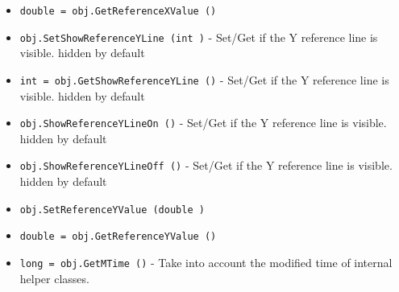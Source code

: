 \begin{itemize}
\item  \verb|double = obj.GetReferenceXValue ()|

\item  \verb|obj.SetShowReferenceYLine (int )| -  Set/Get if the Y reference line is visible. hidden by default

\item  \verb|int = obj.GetShowReferenceYLine ()| -  Set/Get if the Y reference line is visible. hidden by default

\item  \verb|obj.ShowReferenceYLineOn ()| -  Set/Get if the Y reference line is visible. hidden by default

\item  \verb|obj.ShowReferenceYLineOff ()| -  Set/Get if the Y reference line is visible. hidden by default

\item  \verb|obj.SetReferenceYValue (double )|

\item  \verb|double = obj.GetReferenceYValue ()|

\item  \verb|long = obj.GetMTime ()| -  Take into account the modified time of internal helper classes.

\end{itemize}
